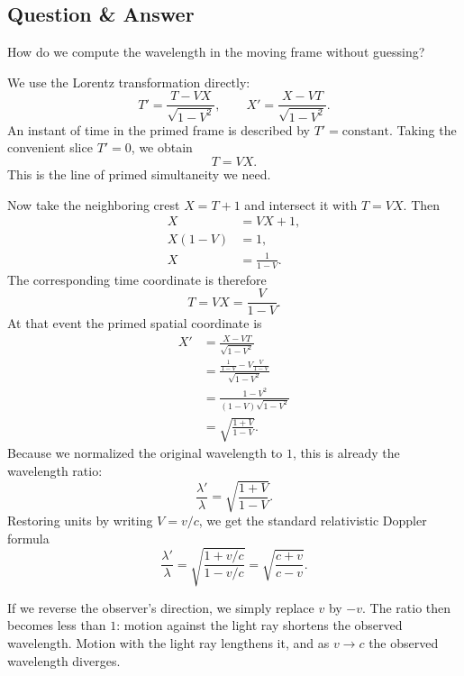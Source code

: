 \subsection{Question \& Answer}

How do we compute the wavelength in the moving frame without guessing?

We use the Lorentz transformation directly:
\begin{equation}
T'=\frac{T-VX}{\sqrt{1-V^2}},
\qquad
X'=\frac{X-VT}{\sqrt{1-V^2}}.
\end{equation}
An instant of time in the primed frame is described by \(T'=\text{constant}\). Taking the convenient slice \(T'=0\), we obtain
\begin{equation}
T=VX.
\end{equation}
This is the line of primed simultaneity we need.

Now take the neighboring crest \(X=T+1\) and intersect it with \(T=VX\). Then
\begin{align}
X &= VX+1,\\
X(1-V) &= 1,\\
X &= \frac{1}{1-V}.
\end{align}
The corresponding time coordinate is therefore
\begin{equation}
T=VX=\frac{V}{1-V}.
\end{equation}
At that event the primed spatial coordinate is
\begin{align}
X'
&=
\frac{X-VT}{\sqrt{1-V^2}}\\
&=
\frac{\frac{1}{1-V}-V\frac{V}{1-V}}{\sqrt{1-V^2}}\\
&=
\frac{1-V^2}{(1-V)\sqrt{1-V^2}}\\
&=
\sqrt{\frac{1+V}{1-V}}.
\end{align}
Because we normalized the original wavelength to \(1\), this is already the wavelength ratio:
\begin{equation}
\frac{\lambda'}{\lambda}=\sqrt{\frac{1+V}{1-V}}.
\end{equation}
Restoring units by writing \(V=v/c\), we get the standard relativistic Doppler formula
\begin{equation}
\frac{\lambda'}{\lambda}
=
\sqrt{\frac{1+v/c}{1-v/c}}
=
\sqrt{\frac{c+v}{c-v}}.
\end{equation}

If we reverse the observer's direction, we simply replace \(v\) by \(-v\). The ratio then becomes less than \(1\): motion against the light ray shortens the observed wavelength. Motion with the light ray lengthens it, and as \(v\to c\) the observed wavelength diverges.

